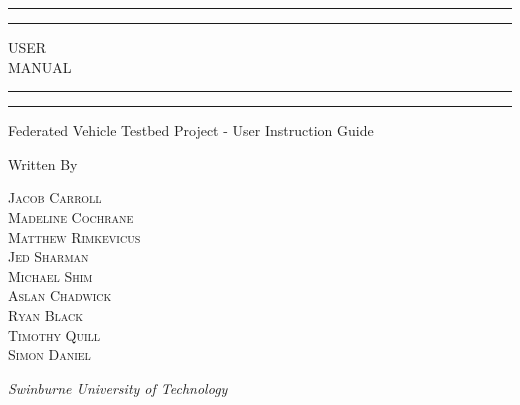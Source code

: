 \documentclass{report}
\begin{document}
\begin{titlepage}
  \centering
  \scshape
  \vspace*{\baselineskip}


  \rule{\textwidth}{1.6pt}\vspace*{-\baselineskip}\vspace*{2pt} %
	\rule{\textwidth}{0.4pt} %

	\vspace{0.75\baselineskip} %

	{\LARGE USER \\ MANUAL\\} %

	\vspace{0.75\baselineskip} %

	\rule{\textwidth}{0.4pt}\vspace*{-\baselineskip}\vspace{3.2pt} %
	\rule{\textwidth}{1.6pt} %

	\vspace{2\baselineskip} %


	Federated Vehicle Testbed Project - User Instruction Guide %

	\vspace*{3\baselineskip} %


	Written By

	\vspace{0.5\baselineskip} %

	{\scshape\Large
  Jacob Carroll \\
	Madeline Cochrane \\
	Matthew Rimkevicus \\
	Jed Sharman \\
	Michael Shim \\
	Aslan Chadwick \\
	Ryan Black \\
	Timothy Quill \\
	Simon Daniel} %

	\vspace{0.5\baselineskip} %

	\textit{Swinburne University of Technology} %

	\vfill %

\end{titlepage}
\end{document}

